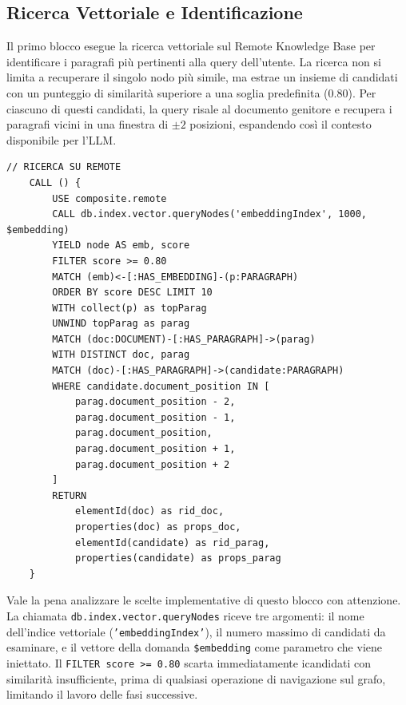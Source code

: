 \subsection{Ricerca Vettoriale e Identificazione}

Il primo blocco esegue la ricerca vettoriale sul Remote Knowledge Base per identificare i paragrafi più pertinenti alla query dell'utente. La ricerca non si limita a recuperare il singolo nodo più simile, ma estrae un insieme di candidati con un punteggio di similarità superiore a una soglia predefinita (0.80). Per ciascuno di questi candidati, la query risale al documento genitore e recupera i paragrafi vicini in una finestra di $\pm 2$ posizioni, espandendo così il contesto disponibile per l'LLM.

\begin{lstlisting}[language=Cypher, breaklines=true, caption={Ricerca Vettoriale e Identificazione dei Paragrafi Rilevanti}, label=lst:vector_search]
    // RICERCA SU REMOTE
    CALL () {
        USE composite.remote
        CALL db.index.vector.queryNodes('embeddingIndex', 1000, $embedding)
        YIELD node AS emb, score
        FILTER score >= 0.80
        MATCH (emb)<-[:HAS_EMBEDDING]-(p:PARAGRAPH)
        ORDER BY score DESC LIMIT 10
        WITH collect(p) as topParag
        UNWIND topParag as parag
        MATCH (doc:DOCUMENT)-[:HAS_PARAGRAPH]->(parag)
        WITH DISTINCT doc, parag
        MATCH (doc)-[:HAS_PARAGRAPH]->(candidate:PARAGRAPH)
        WHERE candidate.document_position IN [
            parag.document_position - 2,
            parag.document_position - 1,
            parag.document_position,
            parag.document_position + 1,
            parag.document_position + 2
        ]
        RETURN
            elementId(doc) as rid_doc,
            properties(doc) as props_doc,
            elementId(candidate) as rid_parag,
            properties(candidate) as props_parag
    }
\end{lstlisting}

\newpage

Vale la pena analizzare le scelte implementative di questo blocco con attenzione. La chiamata \texttt{db.index.vector.queryNodes} riceve tre argomenti: il nome dell'indice vettoriale (\texttt{'embeddingIndex'}), il numero massimo di candidati da esaminare, e il vettore della domanda \texttt{\$embedding} come parametro che viene iniettato. Il \texttt{FILTER score >= 0.80} scarta immediatamente icandidati con similarità insufficiente, prima di qualsiasi operazione di navigazione sul grafo, limitando il lavoro delle fasi successive.

